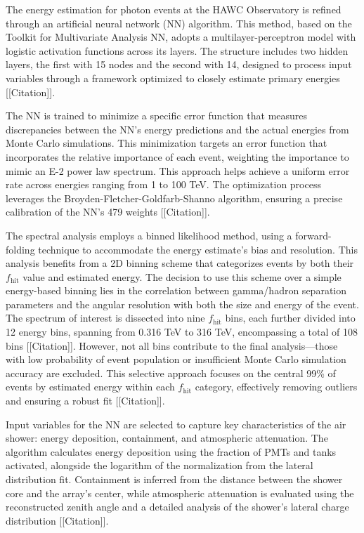 The energy estimation for photon events at the HAWC Observatory is refined through an artificial neural network (NN) algorithm. This method, based on the Toolkit for Multivariate Analysis NN, adopts a multilayer-perceptron model with logistic activation functions across its layers. The structure includes two hidden layers, the first with 15 nodes and the second with 14, designed to process input variables through a framework optimized to closely estimate primary energies [[Citation]].

The NN is trained to minimize a specific error function that measures discrepancies between the NN's energy predictions and the actual energies from Monte Carlo simulations. This minimization targets an error function that incorporates the relative importance of each event, weighting the importance to mimic an E-2 power law spectrum. This approach helps achieve a uniform error rate across energies ranging from 1 to 100 TeV. The optimization process leverages the Broyden-Fletcher-Goldfarb-Shanno algorithm, ensuring a precise calibration of the NN's 479 weights [[Citation]].

The spectral analysis employs a binned likelihood method, using a forward-folding technique to accommodate the energy estimate's bias and resolution. This analysis benefits from a 2D binning scheme that categorizes events by both their $f_{\text{hit}}$ value and estimated energy. The decision to use this scheme over a simple energy-based binning lies in the correlation between gamma/hadron separation parameters and the angular resolution with both the size and energy of the event. The spectrum of interest is dissected into nine $f_{\text{hit}}$ bins, each further divided into 12 energy bins, spanning from 0.316 TeV to 316 TeV, encompassing a total of 108 bins [[Citation]].
However, not all bins contribute to the final analysis—those with low probability of event population or insufficient Monte Carlo simulation accuracy are excluded. This selective approach focuses on the central 99\% of events by estimated energy within each $f_{\text{hit}}$ category, effectively removing outliers and ensuring a robust fit [[Citation]].

Input variables for the NN are selected to capture key characteristics of the air shower: energy deposition, containment, and atmospheric attenuation. The algorithm calculates energy deposition using the fraction of PMTs and tanks activated, alongside the logarithm of the normalization from the lateral distribution fit. Containment is inferred from the distance between the shower core and the array's center, while atmospheric attenuation is evaluated using the reconstructed zenith angle and a detailed analysis of the shower's lateral charge distribution [[Citation]].

